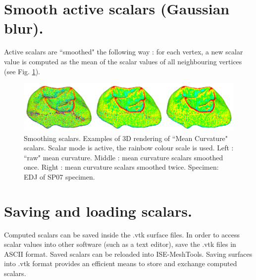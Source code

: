 \section{Smooth active scalars (Gaussian blur).}
Active scalars are ``smoothed" the following way : for each vertex, a new scalar value is computed as
the mean of the scalar values of all neighbouring vertices (see Fig. \ref{smoothing_scalars}).
\begin{figure}
  \centering
  \includegraphics[scale=0.25]{images/Scalars_renreding/Smooth_012.png} 
	\caption{Smoothing scalars. Examples of 3D rendering of ``Mean Curvature" scalars. Scalar mode is active, the rainbow colour scale is used. Left : ``raw" mean curvature. Middle : mean curvature scalars smoothed once. Right : mean curvature scalars smoothed twice. Specimen: EDJ of SP07 specimen.}
\label{smoothing_scalars}
 
\end{figure}




\section{Saving and loading scalars.}
Computed scalars can be saved inside the .vtk surface files. In order to access scalar values into other
software (such as a text editor), save the .vtk files in ASCII format. Saved scalars can be reloaded into
ISE-MeshTools. Saving surfaces into .vtk format provides an efficient means to store and exchange
computed scalars.
